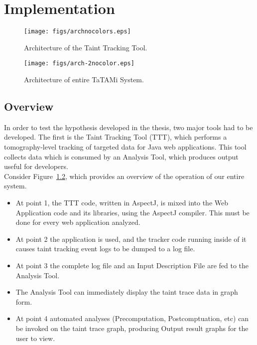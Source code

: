 \documentclass[msc,oneside]{ubcthesis}
\begin{document}
\chapter{Implementation}

\begin{figure}[ht]
  \begin{center}
    \texttt{[image: figs/archnocolors.eps]}
    \caption[Architecture of the Taint Tracking Tool.]{\label{fig:arch} Architecture of the Taint Tracking Tool.}
  \end{center}
\end{figure}

\begin{figure}[ht]
  \begin{center}
    \texttt{[image: figs/arch-2nocolor.eps]}
    \caption[Architecture of entire TaTAMi System.]{\label{fig:arch-2} Architecture of entire TaTAMi System.}
  \end{center}
\end{figure}

\section{Overview}

In order to test the hypothesis developed in the thesis, two major tools had to be developed. The first is the Taint Tracking Tool (TTT), which performs a tomography-level tracking of targeted data for Java web applications. This tool collects data which is consumed by an Analysis Tool, which produces output useful for developers.\\

Consider Figure~\ref{fig:arch-2}, which provides an overview of the operation of our entire system.
\begin{itemize}
\item At point 1, the TTT code, written in AspectJ, is mixed into the Web Application code and its libraries, using the AspectJ compiler. This must be done for every web application analyzed.
\item At point 2 the application is used, and the tracker code running inside of it causes taint tracking event logs to be dumped to a log file.
\item At point 3 the complete log file and an Input Description File are fed to the Analysis Tool.
\item The Analysis Tool can immediately display the taint trace data in graph form.
\item At point 4 automated analyses (Precomputation, Postcomptuation, etc) can be invoked on the taint trace graph, producing Output result graphs for the user to view.
\end{itemize}
\end{document}
